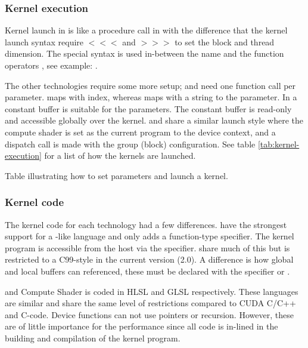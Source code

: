 \subsubsection{Kernel execution}

Kernel launch in {\CU} is like a procedure call in {\CPP} with the difference that the kernel launch syntax require $<<<$ and $>>>$ to set the block and thread dimension. The special syntax is used in-between the name and the function operators \code{()}, see example: .

The other technologies require some more setup; {\OCL} and {\GL} need one function call per parameter. {\OCL} maps with index, whereas {\GL} maps with a string to the parameter. In {\DX} a constant buffer is suitable for the parameters. The constant buffer is read-only and accessible globally over the kernel. {\DX} and {\GL} share a similar launch style where the compute shader is set as the current program to the device context, and a dispatch call is made with the group (block) configuration. See table \ref{tab:kernel-execution} for a list of how the kernels are launched.

\begin{table}[H]
	\centering
	
	\caption{Table illustrating how to set parameters and launch a kernel.}
	\label{tab:kernel-execution}
\end{table}

\subsubsection{Kernel code}

The kernel code for each technology had a few differences. {\CU} have the strongest support for a {\CPP} -like language and only adds a function-type specifier. The kernel program is accessible from the host via the  specifier. {\OCL} share much of this but is restricted to a C99-style in the current version (2.0). A difference is how global and local buffers can referenced, these must be declared with the specifier  or .

{\DX} and {\GL} Compute Shader is coded in \gls{HLSL} and \gls{GLSL} respectively. These languages are similar and share the same level of restrictions compared to CUDA C/C++ and {\OCL} C-code. Device functions can not use pointers or recursion. However, these are of little importance for the performance since all code is in-lined in the building and compilation of the kernel program.

